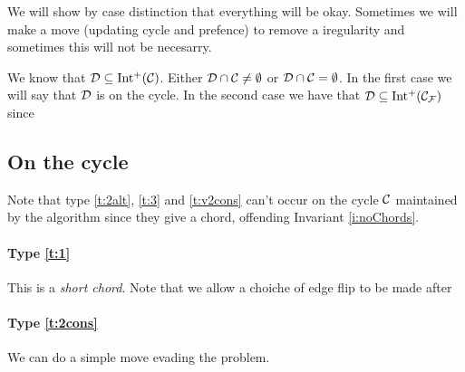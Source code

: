 We will show by case distinction that everything will be okay. Sometimes we will make a move (updating cycle and prefence) to remove a iregularity and sometimes this will not be necesarry.



We know that $\mathcal{D} \subseteq \operatorname{Int^{+}}(\mathcal{C})$. Either $\mathcal{D} \cap \mathcal{C} \neq \emptyset$ or
$\mathcal{D} \cap \mathcal{C} = \emptyset$. In the first case we will say that $\mathcal{D}$ is on the cycle.
In the second case we have that $\mathcal{D} \subseteq \operatorname{Int^{+}}(\mathcal{C}_{\mathcal{F}})$ since


\subsection{On the cycle}
  Note that type \ref{t:2alt}, \ref{t:3} and \ref{t:v2cons} can't occur on the cycle $\mathcal{C}$ maintained by the algorithm since they give a chord, offending Invariant \ref{i:noChords}.
  \paragraph{Type \ref{t:1}}
  This is a \emph{short chord}. Note that we allow a choiche of edge flip to be made after

  \paragraph{Type \ref{t:2cons}}
  We can do a simple move evading the problem.

